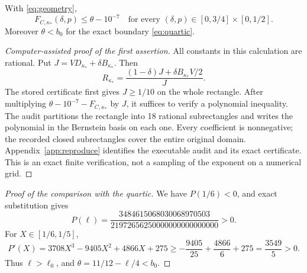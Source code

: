 \begin{proposition}\label{prop:certificate}
With \eqref{eq:geometry},
\[
 F_{C,\kappa_*}(\delta,p)\le\theta-10^{-7}
 \quad\text{for every }(\delta,p)\in[0,3/4]\times[0,1/2].
\]
Moreover $\theta<b_0$ for the exact boundary \eqref{eq:quartic}.
\end{proposition}
\begin{proof}[Computer-assisted proof of the first assertion]
All constants in this calculation are rational. Put
$J=VD_{\kappa_*}+\delta B_{\kappa_*}$. Then
\[
 R_{\kappa_*}=\frac{(1-\delta)J+\delta B_{\kappa_*}V/2}{J}.
\]
The stored certificate first gives $J\ge1/10$ on the whole rectangle.
After multiplying $\theta-10^{-7}-F_{C,\kappa_*}$ by $J$, it suffices
to verify a polynomial inequality. The audit partitions the rectangle
into 18 rational subrectangles and writes the polynomial in the
Bernstein basis on each one. Every coefficient is nonnegative; the
recorded closed subrectangles cover the entire original domain.
Appendix~\ref{app:reproduce} identifies the executable audit and its
exact certificate. This is an exact finite verification, not a sampling
of the exponent on a numerical grid.
\end{proof}
\begin{proof}[Proof of the comparison with the quartic]
We have $P(1/6)<0$, and exact substitution gives
\[
 P(\ell)=\frac{3484615068030068970503}
                    {21972656250000000000000000}>0.
\]
For $X\in[1/6,1/5]$,
\[
 P'(X)=3708X^3-9405X^2+4866X+275
 \ge-\frac{9405}{25}+\frac{4866}{6}+275
 =\frac{3549}{5}>0.
\]
Thus $\ell>\ell_0$, and $\theta=11/12-\ell/4<b_0$.
\end{proof}



